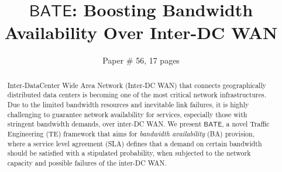 \documentclass[sigconf]{acmart}
\begin{document}
\title{\bf $\mathsf{BATE}$: Boosting Bandwidth Availability Over Inter-DC WAN}


\author{Paper \# 56, 17 pages}


\begin{abstract}
Inter-DataCenter Wide Area Network (Inter-DC WAN) that connects geographically distributed data centers is becoming one of the most critical network infrastructures.
Due to the limited bandwidth resources and inevitable link failures, it is highly challenging to guarantee network availability for services, especially those with stringent bandwidth demands, over inter-DC WAN.
We present $\mathsf{BATE}$,
a novel Traffic Engineering (TE)  framework that 
aims for \textit{bandwidth availability} (BA) provision, where a service level agreement (SLA) defines that a demand on certain bandwidth should be satisfied with a stipulated probability,  when subjected to the network capacity and possible failures of the inter-DC WAN.

\end{abstract}
\end{document}
